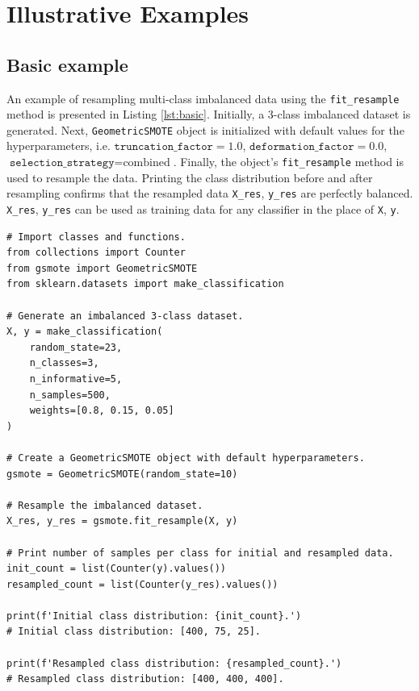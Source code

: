 \documentclass[preprint,12pt, a4paper]{elsarticle}
\begin{document}
\section{Illustrative Examples}

\subsection{Basic example}

An example of resampling multi-class imbalanced data using the \texttt{fit\_resample} method is presented in Listing \ref{lst:basic}. Initially, 
a 3-class imbalanced dataset is generated. Next, \texttt{GeometricSMOTE} object is initialized with default values for the hyperparameters, i.e. $\texttt{truncation\_factor} = 1.0$, $\texttt{deformation\_factor}=0.0$, $\texttt{selection\_strategy}=\textrm{combined}$. Finally, the object's \texttt{fit\_resample} method is used to resample the data. Printing the class distribution before and after resampling confirms that the resampled data \texttt{X\_res}, \texttt{y\_res} are perfectly balanced. \texttt{X\_res}, \texttt{y\_res} can be used as training data for any classifier in the place of \texttt{X}, \texttt{y}.

\begin{lstlisting}[caption={Resampling of imbalanced data using the \texttt{fit\_resample} method.},label={lst:basic}]
# Import classes and functions.
from collections import Counter
from gsmote import GeometricSMOTE
from sklearn.datasets import make_classification

# Generate an imbalanced 3-class dataset.
X, y = make_classification(
    random_state=23, 
    n_classes=3, 
    n_informative=5,
    n_samples=500,
    weights=[0.8, 0.15, 0.05]
)

# Create a GeometricSMOTE object with default hyperparameters.
gsmote = GeometricSMOTE(random_state=10)

# Resample the imbalanced dataset.
X_res, y_res = gsmote.fit_resample(X, y) 

# Print number of samples per class for initial and resampled data. 
init_count = list(Counter(y).values())
resampled_count = list(Counter(y_res).values())

print(f'Initial class distribution: {init_count}.') 
# Initial class distribution: [400, 75, 25].

print(f'Resampled class distribution: {resampled_count}.')
# Resampled class distribution: [400, 400, 400].
\end{lstlisting}
\end{document}
